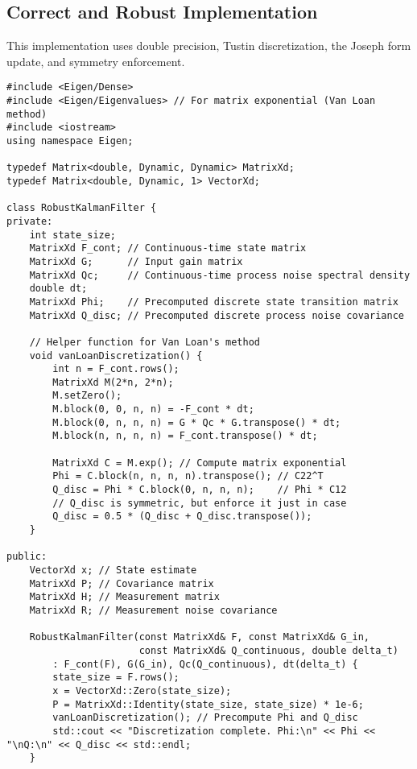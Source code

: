 \documentclass[11pt]{article}
\begin{document}
\subsection{Correct and Robust Implementation}
This implementation uses double precision, Tustin discretization, the Joseph form update, and symmetry enforcement.
\begin{lstlisting}[caption=Robust Kalman Filter Implementation]
#include <Eigen/Dense>
#include <Eigen/Eigenvalues> // For matrix exponential (Van Loan method)
#include <iostream>
using namespace Eigen;

typedef Matrix<double, Dynamic, Dynamic> MatrixXd;
typedef Matrix<double, Dynamic, 1> VectorXd;

class RobustKalmanFilter {
private:
    int state_size;
    MatrixXd F_cont; // Continuous-time state matrix
    MatrixXd G;      // Input gain matrix
    MatrixXd Qc;     // Continuous-time process noise spectral density
    double dt;
    MatrixXd Phi;    // Precomputed discrete state transition matrix
    MatrixXd Q_disc; // Precomputed discrete process noise covariance

    // Helper function for Van Loan's method
    void vanLoanDiscretization() {
        int n = F_cont.rows();
        MatrixXd M(2*n, 2*n);
        M.setZero();
        M.block(0, 0, n, n) = -F_cont * dt;
        M.block(0, n, n, n) = G * Qc * G.transpose() * dt;
        M.block(n, n, n, n) = F_cont.transpose() * dt;

        MatrixXd C = M.exp(); // Compute matrix exponential
        Phi = C.block(n, n, n, n).transpose(); // C22^T
        Q_disc = Phi * C.block(0, n, n, n);    // Phi * C12
        // Q_disc is symmetric, but enforce it just in case
        Q_disc = 0.5 * (Q_disc + Q_disc.transpose());
    }

public:
    VectorXd x; // State estimate
    MatrixXd P; // Covariance matrix
    MatrixXd H; // Measurement matrix
    MatrixXd R; // Measurement noise covariance

    RobustKalmanFilter(const MatrixXd& F, const MatrixXd& G_in,
                       const MatrixXd& Q_continuous, double delta_t)
        : F_cont(F), G(G_in), Qc(Q_continuous), dt(delta_t) {
        state_size = F.rows();
        x = VectorXd::Zero(state_size);
        P = MatrixXd::Identity(state_size, state_size) * 1e-6;
        vanLoanDiscretization(); // Precompute Phi and Q_disc
        std::cout << "Discretization complete. Phi:\n" << Phi << "\nQ:\n" << Q_disc << std::endl;
    }


\end{lstlisting}
\end{document}
